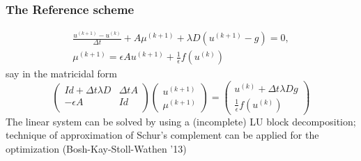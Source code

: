 \documentclass[hyperref={pdfpagemode=FullScreen},9pt]{beamer}
\newcommand{\Frac}[2] {\frac{\textstyle #1} {\textstyle #2}}
\begin{document}
\begin{frame}
\frametitle{The Reference scheme}
\begin{eqnarray}
\label{Classic_CH2}
\Frac{u^{(k+1)}-u^{(k)}}{\Delta t}+A\mu^{(k+1)} +\lambda D(u^{(k+1)}-g)=0,\\
\label{RSS_CH2}
\mu^{(k+1)}=\epsilon Au^{(k+1)}+\Frac{1}{\epsilon} f(u^{(k)})
\end{eqnarray}
say in the matricidal form
$$
\left(
\begin{array}{ll}
Id +\Delta t \lambda D& \Delta t A\\
-\epsilon A & Id\\
\end{array}
\right)
\left(
\begin{array}{l}
u^{(k+1)}\\
\mu^{(k+1)}
\end{array}
\right)
=
\left(
\begin{array}{l}
u^{(k)}+\Delta t  \lambda Dg\\
\Frac{1}{\epsilon}f(u^{(k)})
\end{array}
\right)
$$
The linear system can be solved by using a (incomplete) LU block decomposition; technique of approximation of Schur's complement can be applied for the optimization (Bosh-Kay-Stoll-Wathen '13)
\end{frame}
\end{document}
